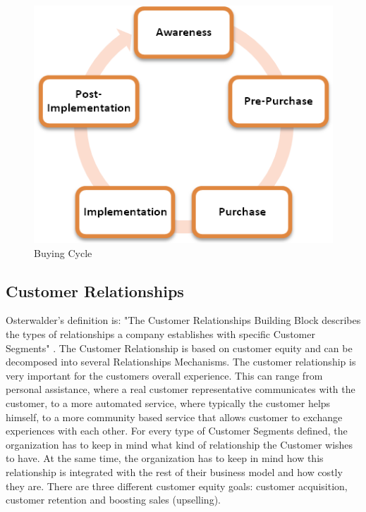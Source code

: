 \begin{figure}[h]
\caption[BuyingCycle]{Buying Cycle}
\label{fig:BuyingCycle}
\begin{center}
\includegraphics[scale=1.0]{5BuyingStages.png}
\end{center}
\end{figure} 

\newpage
\subsection{Customer Relationships}
Osterwalder's definition is: "The Customer Relationships Building Block describes the types of relationships a company establishes with specific Customer Segments" \cite{osterwalder}. The Customer Relationship is based on customer equity and can be decomposed into several Relationships Mechanisms. The customer relationship is very important for the customers overall experience. This can range from personal assistance, where a real customer representative communicates with the customer, to a more automated service, where typically the customer helps himself,  to a more community based service that allows customer to exchange experiences with each other. For every type of Customer Segments defined, the organization has to keep in mind what kind of relationship the Customer wishes to have. At the same time, the organization has to keep in mind how this relationship is integrated with the rest of their business model and how costly they are. There are three different customer equity goals: customer acquisition, customer retention and boosting sales (upselling).

